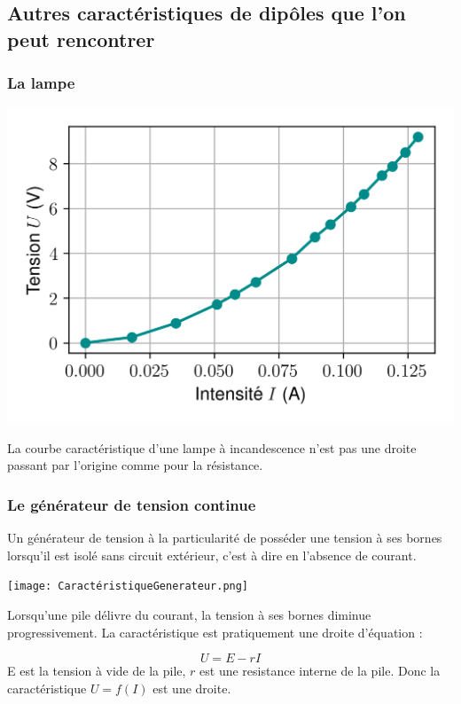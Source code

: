\documentclass[french, a4paper, 12pt]{article}
\begin{document}
\subsection{Autres caractéristiques de dipôles que l'on peut rencontrer}

\subsubsection{La lampe}

\begin{minipage}{.5\textwidth}
	\centering
	\includegraphics[width=.95\textwidth]{CaracteristiqueLampe.png}
\end{minipage}\hfill
\begin{minipage}{.35\textwidth}
	La courbe caractéristique d'une lampe à incandescence n'est pas une droite passant par l'origine comme pour la résistance.
\end{minipage}
\subsubsection{Le générateur de tension continue}
Un générateur de tension à la particularité de posséder une tension à ses bornes lorsqu'il est isolé sans circuit extérieur, c'est à dire en l'absence de courant. 

\begin{minipage}{.5\textwidth}
	\centering
	\texttt{[image: CaractéristiqueGenerateur.png]}
\end{minipage}\hfill
\begin{minipage}{.4\textwidth}
	Lorsqu'une pile délivre du courant, la tension à ses bornes diminue progressivement. La caractéristique est pratiquement une droite d'équation :

	\begin{equation}
		U = E-rI
	\end{equation}
	E est la tension à vide de la pile, $r$ est une resistance interne de la pile. Donc la caractéristique $U=f(I)$ est une droite. 
\end{minipage}
\clearpage
\end{document}
